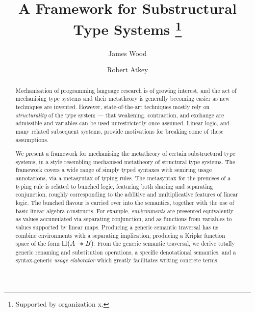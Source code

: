 \documentclass[runningheads]{llncs}
\begin{document}
%
\title{A Framework for Substructural Type Systems
  \thanks{Supported by organization x.}}
%
%
\author{James Wood \and
Robert Atkey}
%
%
%
\maketitle              %
%
\begin{abstract}
  Mechanisation of programming language research is of growing interest, and
  the act of mechanising type systems and their metatheory is generally becoming
  easier as new techniques are invented.
  However, state-of-the-art techniques mostly rely on \emph{structurality} of
  the type system --- that weakening, contraction, and exchange are admissible
  and variables can be used unrestrictedly once assumed.
  Linear logic, and many related subsequent systems, provide motivations for
  breaking some of these assumptions.

  We present a framework for mechanising the metatheory of certain
  substructural type systems, in a style resembling mechanised metatheory of
  structural type systems.
  The framework covers a wide range of simply typed syntaxes with semiring
  usage annotations, via a metasyntax of typing rules.
  The metasyntax for the premises of a typing rule is related to bunched logic,
  featuring both sharing and separating conjunction, roughly corresponding to
  the additive and multiplicative features of linear logic.
  The bunched flavour is carried over into the semantics, together with the use
  of basic linear algebra constructs.
  For example, \emph{environments} are presented equivalently as values
  accumulated via separating conjunction, and as functions from variables to
  values supported by linear maps.
  Producing a generic semantic traversal has us combine environments with a
  separating implication, producing a Kripke function space of the form
  $\Box(A \mathrel{\mathord{-}\hspace{-0.75ex}*} B)$.
  From the generic semantic traversal, we derive totally generic renaming and
  substitution operations, a specific denotational semantics, and a
  syntax-generic \emph{usage elaborator} which greatly facilitates writing
  concrete terms.

\end{abstract}
\end{document}
